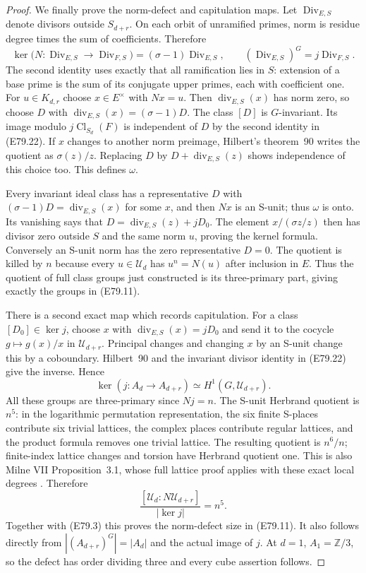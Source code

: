 \begin{proof}
We finally prove the norm-defect and capitulation maps.
Let $\operatorname{Div}_{E,S}$ denote divisors outside
$S_{d+r}$. On each orbit of unramified primes, norm
is residue degree times the sum of coefficients.
Therefore
\[
 \ker\bigl(N:\operatorname{Div}_{E,S}
                 \to\operatorname{Div}_{F,S}\bigr)
       =(\sigma-1)\operatorname{Div}_{E,S},\qquad
 (\operatorname{Div}_{E,S})^G=j\operatorname{Div}_{F,S}.
 \tag{E79.22}
\]
The second identity uses exactly that all ramification
lies in $S$: extension of a base prime is the sum of
its conjugate upper primes, each with coefficient one.
For $u\in K_{d,r}$ choose $x\in E^\times$ with $Nx=u$.
Then $\operatorname{div}_{E,S}(x)$ has norm zero, so
choose $D$ with
$\operatorname{div}_{E,S}(x)=(\sigma-1)D$.
The class $[D]$ is $G$-invariant. Its image modulo
$j\operatorname{Cl}_{S_d}(F)$ is independent of $D$
by the second identity in (E79.22). If $x$ changes
to another norm preimage, Hilbert's theorem~90 writes
the quotient as $\sigma(z)/z$. Replacing $D$ by
$D+\operatorname{div}_{E,S}(z)$ shows independence
of this choice too. This defines $\omega$.

Every invariant ideal class has a representative $D$
with $(\sigma-1)D=\operatorname{div}_{E,S}(x)$ for
some $x$, and then $Nx$ is an S-unit; thus $\omega$
is onto. Its vanishing says that
$D=\operatorname{div}_{E,S}(z)+jD_0$. The element
$x/(\sigma z/z)$ then has divisor zero outside $S$
and the same norm $u$, proving the kernel formula.
Conversely an S-unit norm has the zero representative
$D=0$. The quotient is killed by $n$ because every
$u\in\mathscr U_d$ has $u^n=N(u)$ after inclusion
in $E$. Thus the quotient of full class groups just
constructed is its three-primary part, giving
exactly the groups in (E79.11).

There is a second exact map which records capitulation.
For a class $[D_0]\in\ker j$, choose $x$ with
$\operatorname{div}_{E,S}(x)=jD_0$ and send it to
the cocycle $g\mapsto g(x)/x$ in $\mathscr U_{d+r}$.
Principal changes and changing $x$ by an S-unit change
this by a coboundary. Hilbert~90 and the invariant
divisor identity in (E79.22) give the inverse. Hence
\[
 \ker(j:A_d\to A_{d+r})
       \simeq H^1(G,\mathscr U_{d+r}).
 \tag{E79.23}
\]
All these groups are three-primary since $Nj=n$.
The S-unit Herbrand quotient is $n^5$: in the
logarithmic permutation representation, the six
finite S-places contribute six trivial lattices,
the complex places contribute regular lattices,
and the product formula removes one trivial lattice.
The resulting quotient is $n^6/n$; finite-index
lattice changes and torsion have Herbrand quotient
one. This is also Milne VII Proposition~3.1, whose
full lattice proof applies with these exact local
degrees \cite{E_MilneCFT}. Therefore
\[
 \frac{[\mathscr U_d:N\mathscr U_{d+r}]}
 {|\ker j|}=n^5.
 \tag{E79.24}
\]
Together with (E79.3) this proves the norm-defect
size in (E79.11). It also follows directly from
$|(A_{d+r})^G|=|A_d|$ and the actual image of $j$.
At $d=1$, $A_1=\mathbb Z/3$, so the defect has
order dividing three and every cube assertion follows.


\end{proof}

